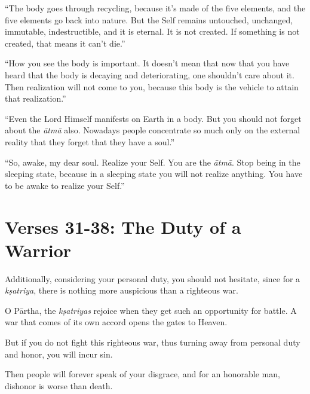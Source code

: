 \enquote{The body goes through recycling, because it’s made of the five elements, and the five elements go back into nature. But the Self remains untouched, unchanged, immutable, indestructible, and it is eternal. It is not created. If something is not created, that means it can’t die.}

\enquote{How you see the body is important. It doesn’t mean that now that you have heard that the body is decaying and deteriorating, one shouldn’t care about it. Then realization will not come to you, because this body is the vehicle to attain that realization.}

\enquote{Even the Lord Himself manifests on Earth in a body. But you should not forget about the \textit{ātmā} also. Nowadays people concentrate so much only on the external reality that they forget that they have a soul.}


\enquote{So, awake, my dear soul. Realize your Self. You are the \textit{ātmā}. Stop being in the sleeping state, because in a sleeping state you will not realize anything. You have to be awake to realize your Self.}


\section{Verses 31-38: The Duty of a Warrior}\label{sec-verses-31-38-the-duty-of-a-warrior}

{Additionally, considering your personal duty, you should not hesitate, since for a \textit{kṣatriya}, there is nothing more auspicious than a righteous war.}

{O Pārtha, the \textit{kṣatriyas} rejoice when they get such an opportunity for battle. A war that comes of its own accord opens the gates to Heaven.}

{But if you do not fight this righteous war, thus turning away from personal duty and honor, you will incur sin.}

{Then people will forever speak of your disgrace, and for an honorable man, dishonor is worse than death.}

